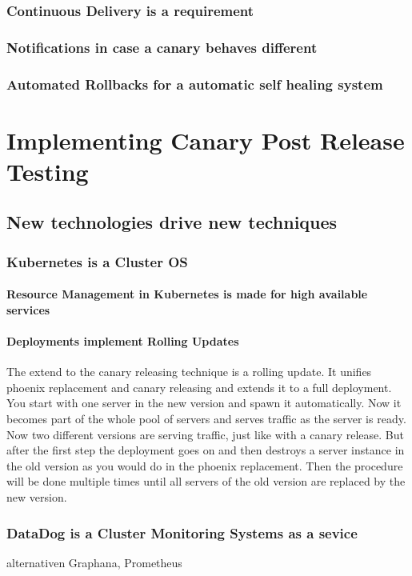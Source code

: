 \subsection{Continuous Delivery is a requirement}
\subsection{Notifications in case a canary behaves different}
\subsection{Automated Rollbacks for a automatic self healing system}

\chapter{Implementing Canary Post Release Testing}
\section{New technologies drive new techniques}
\subsection{Kubernetes is a Cluster OS}
\subsubsection{Resource Management in Kubernetes is made for high available services}
\subsubsection{Deployments implement Rolling Updates}

The extend to the canary releasing technique is a rolling update. It unifies phoenix replacement and canary releasing and extends it to a full deployment. You start with one server in the new version and spawn it automatically. Now it becomes part of the whole pool of servers and serves traffic as the server is ready. Now two different versions are serving traffic, just like with a canary release. But after the first step the deployment goes on and then destroys a server instance in the old version as you would do in the phoenix replacement. Then the procedure will be done multiple times until all servers of the old version are replaced by the new version.

\subsection{DataDog is a Cluster Monitoring Systems as a sevice}
alternativen Graphana, Prometheus
